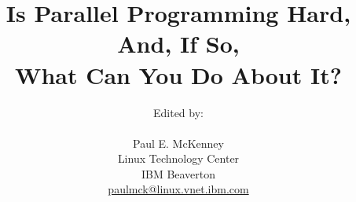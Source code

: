 \documentclass[10pt,twocolumn]{pfbook} %
\begin{document}
\makeatletter
\renewcommand\lstinline[1][]{%
\leavevmode\bgroup %
\def\lst@boxpos{b}%
\lsthk@PreSet\lstset{flexiblecolumns,#1}%
\lsthk@TextStyle
\ifnum `}=\z@\fi
\@ifnextchar\bgroup{%
\ifnum`{=\z@}\fi%
\afterassignment\lst@InlineG \let\@let@token}{%
\ifnum`{=\z@}\fi\lstinline@}}
\makeatother
% ---  End of workaround for Fedora 23 Texlive bug
\newcommand{\co}[1]{\lstinline[breaklines=true,breakatwhitespace=true]{#1}}
\newcommand{\nbco}[1]{\hbox{\lstinline[breaklines=false,breakatwhitespace=false]{#1}}} % no break lines for short snippet
\newcommand{\qco}[1]{``\nbco{#1}''} % \nbco with quotation marks
\newcommand{\tco}[1]{\texttt{\detokenize{#1}}} % for code in tabular environment
% \tco{} will break at spaces but not at underscores
\newcommand{\nf}[1]{\textnormal{#1}} % to return to normal font
\newcommand{\qop}[1]{{\sffamily #1}} % QC operator such as H, T, S, etc.

\DeclareRobustCommand{\euler}{\ensuremath{\mathrm{e}}}
\DeclareRobustCommand{\O}[1]{\ensuremath{\mathcal{O}(#1)}}
\newcommand{\Power}[1]{POWER#1}
\newcommand{\GNUC}{GNU~C}
\newcommand{\GCC}{GCC}
%\newcommand{\GCC}{\co{gcc}} % For those who prefer "gcc"
\newcommand{\IRQ}{IRQ}
%\newcommand{\IRQ}{irq}      % For those who prefer "irq"
\newcommand{\mytexttrademark}{}
\newcommand{\mytextregistered}{}
%\newcommand{\mytexttrademark}{\textsuperscript\texttrademark}
%\newcommand{\mytextregistered}{\textsuperscript\textregistered}

\newcommand{\Epigraph}[2]{\epigraphhead[65]{\rmfamily\epigraph{#1}{#2}}}

 % Hyphenation exceptions for US English from hyphenex package
 % Hyphenation exceptions for perfbook

\title{
  Is Parallel Programming Hard, And, If So, \\
  What Can You Do About It?}
\author{
	Edited by: \\
	\\
	Paul E. McKenney \\
	Linux Technology Center \\
	IBM Beaverton \\
	\href{mailto:paulmck@linux.vnet.ibm.com}{paulmck@linux.vnet.ibm.com} \\
} %

\end{document}
